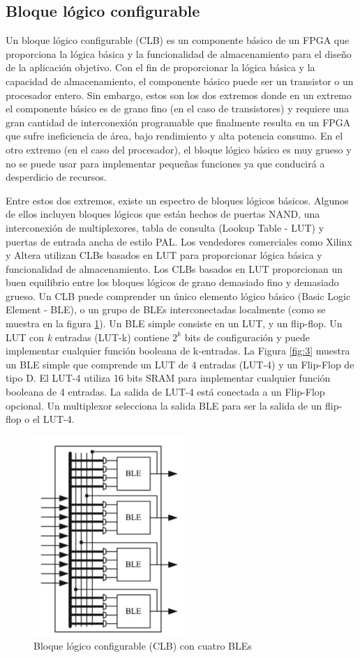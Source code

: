 \documentclass[12pt]{article}
\begin{document}
\subsection{Bloque lógico configurable}

Un bloque lógico configurable (CLB) es un componente básico de un FPGA que proporciona la lógica básica y la funcionalidad de almacenamiento para el diseño de la aplicación objetivo. Con el fin de proporcionar la lógica básica y la capacidad de almacenamiento, el componente básico puede ser un transistor o un procesador entero. Sin embargo, estos son los dos extremos donde en un extremo el componente básico es de grano fino (en el caso de transistores) y requiere una gran cantidad de interconexión programable que finalmente resulta en un FPGA que sufre ineficiencia de área, bajo rendimiento y alta potencia consumo. En el otro extremo (en el caso del procesador), el bloque lógico básico es muy grueso y no se puede usar para implementar pequeñas funciones ya que conducirá a desperdicio de recursos.

Entre estos dos extremos, existe un espectro de bloques lógicos básicos. Algunos de ellos incluyen bloques lógicos que están hechos de puertas NAND, una interconexión de multiplexores, tabla de consulta (Lookup Table - LUT) y puertas de entrada ancha de estilo PAL. Los vendedores comerciales como Xilinx y Altera utilizan CLBs basados ​​en LUT para proporcionar lógica básica y funcionalidad de almacenamiento. Los CLBs basados ​​en LUT proporcionan un buen equilibrio entre los bloques lógicos de grano demasiado fino y demasiado grueso. Un CLB puede comprender un único elemento lógico básico (Basic Logic Element - BLE), o un grupo de BLEs interconectadas localmente (como se muestra en la figura \ref{fig:2}). Un BLE simple consiste en un LUT, y un flip-flop. Un LUT con \textit{k} entradas (LUT-k) contiene $2^{k}$ bits de configuración y puede implementar cualquier función booleana de k-entradas. La Figura \ref{fig:3} muestra un BLE simple que comprende un LUT de 4 entradas (LUT-4) y un Flip-Flop de tipo D. El LUT-4 utiliza 16 bits SRAM para implementar cualquier función booleana de 4 entradas. La salida de LUT-4 está conectada a un Flip-Flop opcional. Un multiplexor selecciona la salida BLE para ser la salida de un flip-flop o el LUT-4.

\begin{figure}[H]
  \centering
  \includegraphics[]{2-CLB-having-four.png}
  \caption{Bloque lógico configurable (CLB) con cuatro BLEs}
  \label{fig:2}
\end{figure}
\end{document}
